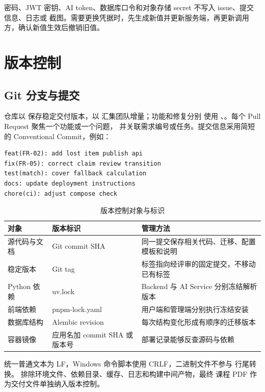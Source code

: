 密码、JWT 密钥、AI token、数据库口令和对象存储 secret 不写入 issue、提交信息、日志或
截图。需要更换凭据时，先生成新值并更新服务端，再更新调用方，确认新值生效后撤销旧值。

\section{版本控制}

\subsection{Git 分支与提交}

仓库以  保存稳定交付版本，以  汇集团队增量；功能和修复分别
使用 、。每个 Pull Request 聚焦一个功能或一个问题，
并关联需求编号或任务。提交信息采用简短的 Conventional Commit，例如：

\begin{verbatim}
feat(FR-02): add lost item publish api
fix(FR-05): correct claim review transition
test(match): cover fallback calculation
docs: update deployment instructions
chore(ci): adjust compose check
\end{verbatim}

\begin{table}[H]
  \centering
  \caption{版本控制对象与标识}
  \begin{tabularx}{\textwidth}{L{3.2cm}L{4.0cm}Y}
    \toprule
    对象 & 版本标识 & 管理方法 \\
    \midrule
    源代码与文档 & Git commit SHA & 同一提交保存相关代码、迁移、配置模板和说明 \\
    稳定版本 & Git tag & 标签指向经评审的固定提交，不移动已有标签 \\
    Python 依赖 & uv.lock & Backend 与 AI Service 分别冻结解析版本 \\
    前端依赖 & pnpm-lock.yaml & 用户端和管理端分别执行冻结安装 \\
    数据库结构 & Alembic revision & 每次结构变化形成有顺序的迁移版本 \\
    容器镜像 & 应用名加 commit SHA 或版本号 & 部署记录能够反查源码与依赖 \\
    \bottomrule
  \end{tabularx}
\end{table}

 统一普通文本为 LF，Windows 命令脚本使用 CRLF，二进制文件不参与
行尾转换。 排除环境文件、依赖目录、缓存、日志和构建中间产物，最终
课程 PDF 作为交付文件单独纳入版本控制。

